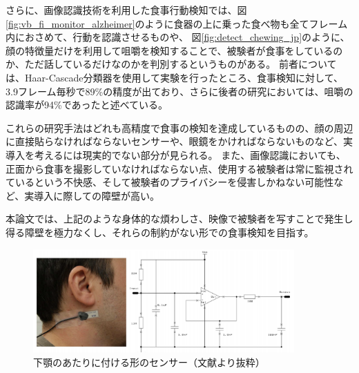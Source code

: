 さらに、画像認識技術を利用した食事行動検知では、図\ref{fig:vb_fi_monitor_alzheimer}のように食器の上に乗った食べ物も全てフレーム内におさめて、行動を認識させるもの\cite{vb_fi_monitor_alzheimer}や、
図\ref{fig:detect_chewing_jp}のように、顔の特徴量だけを利用して咀嚼を検知することで、被験者が食事をしているのか、ただ話しているだけなのかを判別する\cite{detect_chewing_jp}というものがある。
前者\cite{vb_fi_monitor_alzheimer}については、Haar-Cascade分類器を使用して実験を行ったところ、食事検知に対して、3.9フレーム毎秒で89\%の精度が出ており、さらに後者の研究\cite{detect_chewing_jp}においては、咀嚼の認識率が94\%であったと述べている。

これらの研究手法はどれも高精度で食事の検知を達成しているものの、顔の周辺に直接貼らなければならないセンサーや、眼鏡をかければならないものなど、実導入を考えるには現実的でない部分が見られる。
また、画像認識においても、正面から食事を撮影していなければならない点、使用する被験者は常に監視されているという不快感、そして被験者のプライバシーを侵害しかねない可能性など、実導入に際しての障壁が高い。

本論文では、上記のような身体的な煩わしさ、映像で被験者を写すことで発生し得る障壁を極力なくし、それらの制約がない形での食事検知を目指す。

\begin{figure}[htbp]
  \caption{下顎のあたりに付ける形のセンサー（文献\cite{detect_food_ingestion_chewing}より抜粋）}
  \label{fig:detect_food_ingestion_chewing}
  \begin{center}
    \includegraphics[bb=0 0 700 300,width=10cm]{assets/fi_monitor_chewing.png}
  \end{center}
\end{figure}

